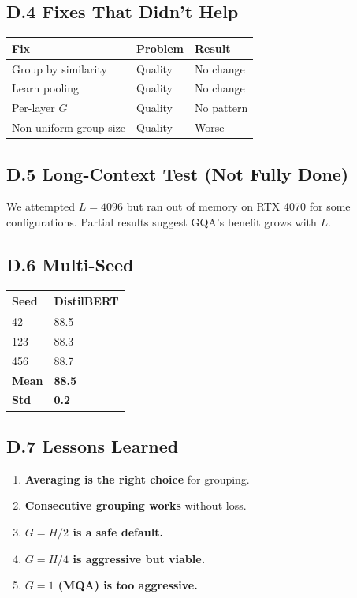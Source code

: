 \subsection{D.4 Fixes That Didn't Help}

\begin{table}[H]
\centering
\small
\begin{tabular}{lll}
\toprule
\textbf{Fix} & \textbf{Problem} & \textbf{Result} \\
\midrule
Group by similarity & Quality & No change \\
Learn pooling & Quality & No change \\
Per-layer $G$ & Quality & No pattern \\
Non-uniform group size & Quality & Worse \\
\bottomrule
\end{tabular}
\end{table}

\subsection{D.5 Long-Context Test (Not Fully Done)}

We attempted $L = 4096$ but ran out of memory on RTX 4070 for some 
configurations. Partial results suggest GQA's benefit grows with $L$.

\subsection{D.6 Multi-Seed}

\begin{table}[H]
\centering
\small
\begin{tabular}{ll}
\toprule
\textbf{Seed} & \textbf{DistilBERT} \\
\midrule
42 & 88.5 \\
123 & 88.3 \\
456 & 88.7 \\
\textbf{Mean} & \textbf{88.5} \\
\textbf{Std} & \textbf{0.2} \\
\bottomrule
\end{tabular}
\end{table}

\subsection{D.7 Lessons Learned}

\begin{enumerate}
\item \textbf{Averaging is the right choice} for grouping.
\item \textbf{Consecutive grouping works} without loss.
\item \textbf{$G = H/2$ is a safe default.}
\item \textbf{$G = H/4$ is aggressive but viable.}
\item \textbf{$G = 1$ (MQA) is too aggressive.}
\end{enumerate}
